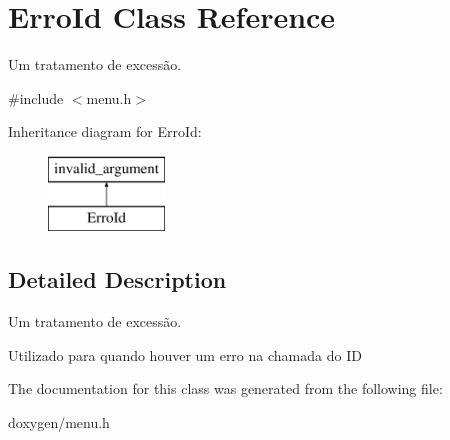 \hypertarget{class_erro_id}{}\section{Erro\+Id Class Reference}
\label{class_erro_id}


Um tratamento de excessão.  




{\ttfamily \#include $<$menu.\+h$>$}

Inheritance diagram for Erro\+Id\+:\begin{figure}[H]
\begin{center}
\leavevmode
\includegraphics[height=2.000000cm]{class_erro_id}
\end{center}
\end{figure}


\subsection{Detailed Description}
Um tratamento de excessão. 

Utilizado para quando houver um erro na chamada do ID 

The documentation for this class was generated from the following file\+:\begin{DoxyCompactItemize}
\item 
doxygen/menu.\+h\end{DoxyCompactItemize}
